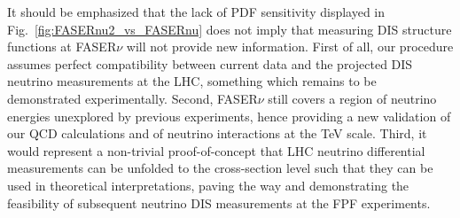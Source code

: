 It should be emphasized that the lack of PDF sensitivity displayed in Fig.~\ref{fig:FASERnu2_vs_FASERnu}
does not imply that measuring DIS structure functions at FASER$\nu$ will not provide new information.
%
First of all, our procedure assumes perfect compatibility between current data and the projected DIS
neutrino measurements at the LHC, something which remains to be demonstrated experimentally.
%
Second, FASER$\nu$ still covers a region of neutrino energies unexplored by previous experiments, hence providing
a new validation of our QCD calculations and of neutrino interactions at the TeV scale.
%
Third, it would represent a non-trivial proof-of-concept that LHC neutrino differential measurements can be
unfolded to the cross-section level such that they can be used in  theoretical
interpretations, paving the way and demonstrating the feasibility of subsequent neutrino DIS
measurements at the FPF experiments.
